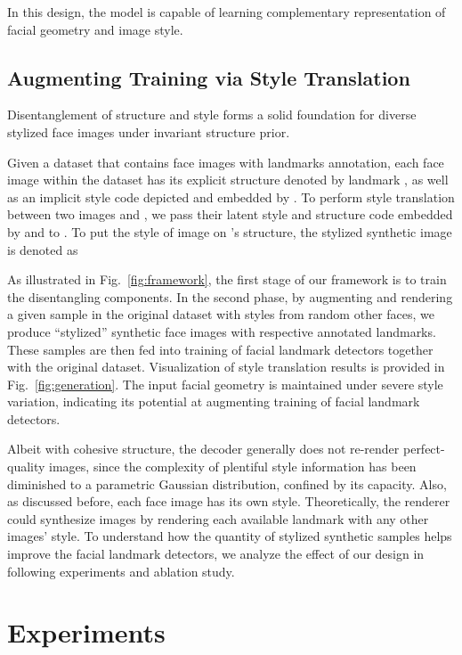 \documentclass[10pt,twocolumn,letterpaper]{article}
\begin{document}
In this design, the model is capable of learning complementary representation of facial geometry and image style. 

\subsection{Augmenting Training via Style Translation}

Disentanglement of structure and style forms a solid foundation for diverse stylized face images under invariant structure prior. 

Given a dataset  that contains  face images with landmarks annotation, each face image  within the dataset has its explicit structure denoted by landmark , as well as an implicit style code  depicted and embedded by . To perform style translation between two images  and , we pass their latent style and structure code embedded by  and  to . To put the style of image  on 's structure, the stylized synthetic image is denoted as

As illustrated in Fig.~\ref{fig:framework}, the first stage of our framework is to train the disentangling components. In the second phase, by augmenting and rendering a given sample  in the original dataset  with styles from random  other faces, we produce  ``stylized'' synthetic face images with respective annotated landmarks. These samples are then fed into training of facial landmark detectors together with the original dataset. Visualization of style translation results is provided in Fig.~\ref{fig:generation}. The input facial geometry is maintained under severe style variation, indicating its potential at augmenting training of facial landmark detectors.

Albeit with cohesive structure, the decoder generally does not re-render perfect-quality images, since the complexity of plentiful style information has been diminished to a parametric Gaussian distribution, confined by its capacity. Also, as discussed before, each face image  has its own style. Theoretically, the renderer could synthesize  images by rendering each available landmark with any other images' style. To understand how the quantity of stylized synthetic samples helps improve the facial landmark detectors, we analyze the effect of our design in following experiments and ablation study. 

\section{Experiments}
\end{document}
